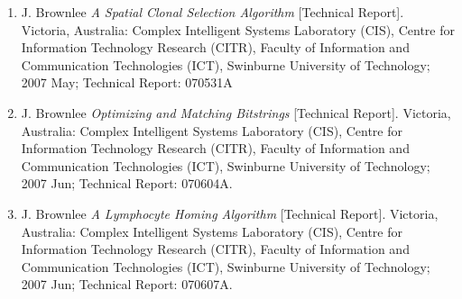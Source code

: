 \begin{enumerate}
	\item J. Brownlee \emph{A Spatial Clonal Selection Algorithm} [Technical Report]. Victoria, Australia: Complex Intelligent Systems Laboratory (CIS), Centre for Information Technology Research (CITR), Faculty of Information and Communication Technologies (ICT), Swinburne University of Technology; 2007 May; Technical Report: 070531A
	\item J. Brownlee \emph{Optimizing and Matching Bitstrings} [Technical Report]. Victoria, Australia: Complex Intelligent Systems Laboratory (CIS), Centre for Information Technology Research (CITR), Faculty of Information and Communication Technologies (ICT), Swinburne University of Technology; 2007 Jun; Technical Report: 070604A.
	\item J. Brownlee \emph{A Lymphocyte Homing Algorithm} [Technical Report]. Victoria, Australia: Complex Intelligent Systems Laboratory (CIS), Centre for Information Technology Research (CITR), Faculty of Information and Communication Technologies (ICT), Swinburne University of Technology; 2007 Jun; Technical Report: 070607A.
	

\end{enumerate}
